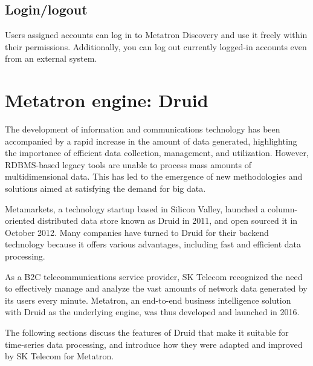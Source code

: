 \documentclass[letterpaper,10pt,english]{sphinxmanual}
\begin{document}
\subsection{Login/logout}
\label{\detokenize{discovery/part01/structure:id10}}
Users assigned accounts can log in to Metatron Discovery and use it freely within their permissions. Additionally, you can log out currently logged-in accounts even from an external system.


\section{Metatron engine: Druid}
\label{\detokenize{discovery/part01/engine:metatron-druid}}\label{\detokenize{discovery/part01/engine::doc}}
The development of information and communications technology has been accompanied by a rapid increase in the amount of data generated, highlighting the importance of efficient data collection, management, and utilization. However, RDBMS-based legacy tools are unable to process mass amounts of multidimensional data. This has led to the emergence of new methodologies and solutions aimed at satisfying the demand for big data.

Metamarkets, a technology startup based in Silicon Valley, launched a column-oriented distributed data store known as Druid in 2011, and open sourced it in October 2012. Many companies have turned to Druid for their backend technology because it offers various advantages, including fast and efficient data processing.

As a B2C telecommunications service provider, SK Telecom recognized the need to effectively manage and analyze the vast amounts of network data generated by its users every minute. Metatron, an end-to-end business intelligence solution with Druid as the underlying engine, was thus developed and launched in 2016.
\begin{quote}

\begin{figure}[H]
\centering

\noindent{}
\end{figure}
\end{quote}

The following sections discuss the features of Druid that make it suitable for time-series data processing, and introduce how they were adapted and improved by SK Telecom for Metatron.
\end{document}
